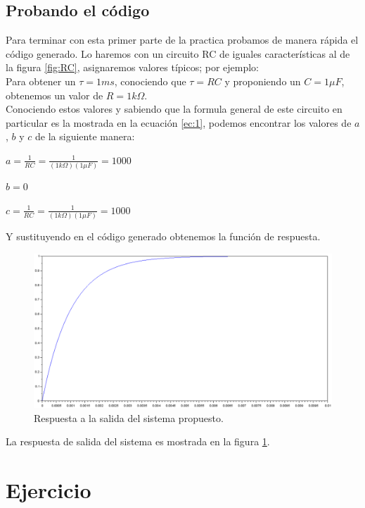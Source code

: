 \documentclass[letterpaper,spanish,12pt]{report}
\begin{document}
	\section{Probando el c\'odigo}
	
Para terminar con esta primer parte de la practica probamos de manera r\'apida el c\'odigo generado. Lo haremos con un circuito RC de iguales caracter\'isticas al de la figura \ref{fig:RC}, asignaremos valores t\'ipicos; por ejemplo:\medskip \\ Para obtener un $\tau = 1ms$, conociendo que $\tau = RC$ y proponiendo un $C = 1 \mu F$, obtenemos un valor de $R = 1k\Omega$. \medskip \\ Conociendo estos valores y sabiendo que la formula general de este circuito en particular es la mostrada en la ecuaci\'on \ref{ec:1}, podemos encontrar los valores de $a$, $b$ y $c$ de la siguiente manera:
	\begin{center} $a = \frac {1} {RC} = \frac {1} {(1k\Omega)(1\mu F)} = 1000$ \end{center}
	\begin{center} $b = 0$ \end{center}
	\begin{center} $c = \frac {1} {RC} = \frac {1} {(1k\Omega)(1\mu F)} = 1000$ \end{center}
Y sustituyendo en el c\'odigo generado obtenemos la funci\'on de respuesta.

\begin{figure}[h]
	\centering
		\includegraphics[width=1.00\textwidth]{Grafica1.eps}
	\caption{Respuesta a la salida del sistema propuesto.}
	\label{graf:1}
\end{figure}

 La respuesta de salida del sistema es mostrada en la figura \ref{graf:1}.

	\chapter{Ejercicio}
\end{document}
